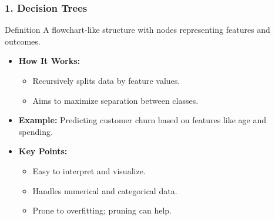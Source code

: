 \documentclass[aspectratio=169]{beamer}
\begin{document}
\begin{frame}[fragile]
    \frametitle{1. Decision Trees}
    \begin{block}{Definition}
        A flowchart-like structure with nodes representing features and outcomes.
    \end{block}

    \begin{itemize}
        \item \textbf{How It Works:}
        \begin{itemize}
            \item Recursively splits data by feature values.
            \item Aims to maximize separation between classes.
        \end{itemize}
        
        \item \textbf{Example:}
        Predicting customer churn based on features like age and spending.

        \item \textbf{Key Points:}
        \begin{itemize}
            \item Easy to interpret and visualize.
            \item Handles numerical and categorical data.
            \item Prone to overfitting; pruning can help.
        \end{itemize}
    \end{itemize}
\end{frame}
\end{document}
